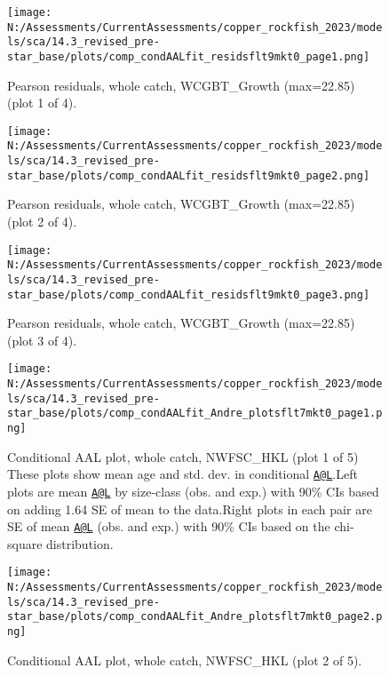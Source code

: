 \documentclass[11pt,
  english,
  letterpaper,
]{article}
\begin{document}
\begin{figure}
\centering
\texttt{[image: N:/Assessments/CurrentAssessments/copper\_rockfish\_2023/models/sca/14.3\_revised\_pre-star\_base/plots/comp\_condAALfit\_residsflt9mkt0\_page1.png]}
\caption{Pearson residuals, whole catch, WCGBT\_Growth (max=22.85) (plot 1 of 4).\label{fig:comp_condAALfit_residsflt9mkt0_page1}}
\end{figure}

\begin{figure}
\centering
\texttt{[image: N:/Assessments/CurrentAssessments/copper\_rockfish\_2023/models/sca/14.3\_revised\_pre-star\_base/plots/comp\_condAALfit\_residsflt9mkt0\_page2.png]}
\caption{Pearson residuals, whole catch, WCGBT\_Growth (max=22.85) (plot 2 of 4).\label{fig:comp_condAALfit_residsflt9mkt0_page2}}
\end{figure}

\begin{figure}
\centering
\texttt{[image: N:/Assessments/CurrentAssessments/copper\_rockfish\_2023/models/sca/14.3\_revised\_pre-star\_base/plots/comp\_condAALfit\_residsflt9mkt0\_page3.png]}
\caption{Pearson residuals, whole catch, WCGBT\_Growth (max=22.85) (plot 3 of 4).\label{fig:comp_condAALfit_residsflt9mkt0_page3}}
\end{figure}

\begin{figure}
\centering
\texttt{[image: N:/Assessments/CurrentAssessments/copper\_rockfish\_2023/models/sca/14.3\_revised\_pre-star\_base/plots/comp\_condAALfit\_Andre\_plotsflt7mkt0\_page1.png]}
\caption{Conditional AAL plot, whole catch, NWFSC\_HKL (plot 1 of 5) These plots show mean age and std. dev. in conditional \href{mailto:A@L}{\nolinkurl{A@L}}.Left plots are mean \href{mailto:A@L}{\nolinkurl{A@L}} by size-class (obs. and exp.) with 90\% CIs based on adding 1.64 SE of mean to the data.Right plots in each pair are SE of mean \href{mailto:A@L}{\nolinkurl{A@L}} (obs. and exp.) with 90\% CIs based on the chi-square distribution.\label{fig:comp_condAALfit_Andre_plotsflt7mkt0_page1}}
\end{figure}

\begin{figure}
\centering
\texttt{[image: N:/Assessments/CurrentAssessments/copper\_rockfish\_2023/models/sca/14.3\_revised\_pre-star\_base/plots/comp\_condAALfit\_Andre\_plotsflt7mkt0\_page2.png]}
\caption{Conditional AAL plot, whole catch, NWFSC\_HKL (plot 2 of 5).\label{fig:comp_condAALfit_Andre_plotsflt7mkt0_page2}}
\end{figure}
\end{document}
